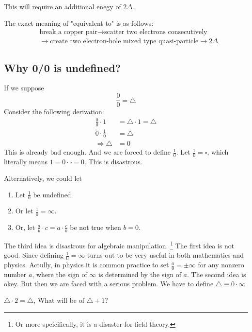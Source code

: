 \documentclass{article}
\numberwithin{equation}{subsection} %
\theoremstyle{definition}
\begin{document}
    This will require an additional enegy of $2\Delta$.
    
    The exact meaning of "equivalent to" is as follows:
    \begin{align}
        & \text{break a copper pair} \longrightarrow 
        \text{scatter two electrons consecutively} 
        \nonumber\\ & \longrightarrow 
        \text{create two electron-hole mixed type quasi-particle} \longrightarrow 2\Delta \nonumber
    \end{align}

    \subsection{Why 0/0 is undefined?}
    If we suppose
    $$ \frac{0}{0}= \triangle $$
    Consider the following derivation:
    \begin{align}
	    \frac{0}{0} \cdot 1 &= \triangle \cdot 1 = \triangle \\
	    0 \cdot \frac{1}{0} &= \triangle\\
	    \Rightarrow \triangle &= 0
    \end{align}
    This is already bad enough. And we are forced to define $\frac{1}{0}$.
    Let $\frac{1}{0} = \square$, which literally means $1=0\cdot \square = 0$.
    This is disastrous.

    Alternatively, we could let
    \begin{enumerate}
	    \item Let $\frac{1}{0}$ be undefined.
	    \item Or let $\frac{1}{0} =
		    \infty$.
	    \item Or, let $\frac{a}{b}\cdot c= a\cdot \frac{c}{b}$ be not 
		    true when $b=0$.
    \end{enumerate}
    The third idea is disastrous for algebraic manipulation. \footnote{
    Or more speicifically, it is a disaster for field theory.
    }
    The first idea is not good. Since defining $\frac{1}{0}=\infty$ turns
    out to be very useful in both mathematics and physics. Actully, in
    physics it is common practice to set $\frac{a}{0}=\pm\infty$ for
    any nonzero number $a$, where the sign of $\infty$ is determined by 
    the sign of $a$.
    The second idea is okey. But then we are faced with a serious problem.
    We have to define $\triangle \equiv 0 \cdot \infty$

    $\triangle \cdot 2 = \triangle$, What will be of $\triangle + 1$?
\end{document}
